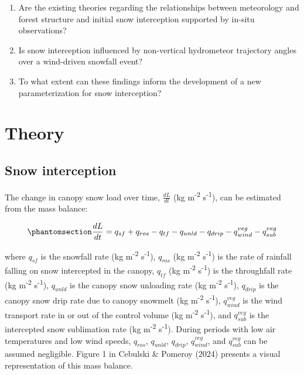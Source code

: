 \documentclass[
  letterpaper,
  DIV=11,
  numbers=noendperiod]{scrartcl}
\begin{document}
\begin{enumerate}
\def\labelenumi{\arabic{enumi}.}
\item
  Are the existing theories regarding the relationships between
  meteorology and forest structure and initial snow interception
  supported by in-situ observations?
\item
  Is snow interception influenced by non-vertical hydrometeor trajectory
  angles over a wind-driven snowfall event?
\item
  To what extent can these findings inform the development of a new
  parameterization for snow interception?
\end{enumerate}

\section{Theory}\label{theory}

\subsection{Snow interception}\label{snow-interception}

The change in canopy snow load over time, \(\frac{dL}{dt}\) (kg
m\textsuperscript{-2} s\textsuperscript{-1}), can be estimated from the
mass balance:

\begin{equation}\phantomsection\label{eq-canopy-mass-bal}{
\frac{dL}{dt} = 
q_{sf} + q_{ros} - q_{tf} - q_{unld} - q_{drip} - q_{wind}^{veg} - q_{sub}^{veg}
}\end{equation}

where \(q_{sf}\) is the snowfall rate (kg m\textsuperscript{-2}
s\textsuperscript{-1}), \(q_{ros}\) (kg m\textsuperscript{-2}
s\textsuperscript{-1}) is the rate of rainfall falling on snow
intercepted in the canopy, \(q_{tf}\) (kg m\textsuperscript{-2}
s\textsuperscript{-1}) is the throughfall rate (kg m\textsuperscript{-2}
s\textsuperscript{-1}), \(q_{unld}\) is the canopy snow unloading rate
(kg m\textsuperscript{-2} s\textsuperscript{-1}), \(q_{drip}\) is the
canopy snow drip rate due to canopy snowmelt (kg m\textsuperscript{-2}
s\textsuperscript{-1}), \(q_{wind}^{veg}\) is the wind transport rate in
or out of the control volume (kg m\textsuperscript{-2}
s\textsuperscript{-1}), and \(q_{sub}^{veg}\) is the intercepted snow
sublimation rate (kg m\textsuperscript{-2} s\textsuperscript{-1}).
During periods with low air temperatures and low wind speeds,
\(q_{ros}\), \(q_{unld}\), \(q_{drip}\), \(q_{wind}^{veg}\), and
\(q_{sub}^{veg}\) can be assumed negligible. Figure 1 in Cebulski \&
Pomeroy (2024) presents a visual representation of this mass balance.
\end{document}
